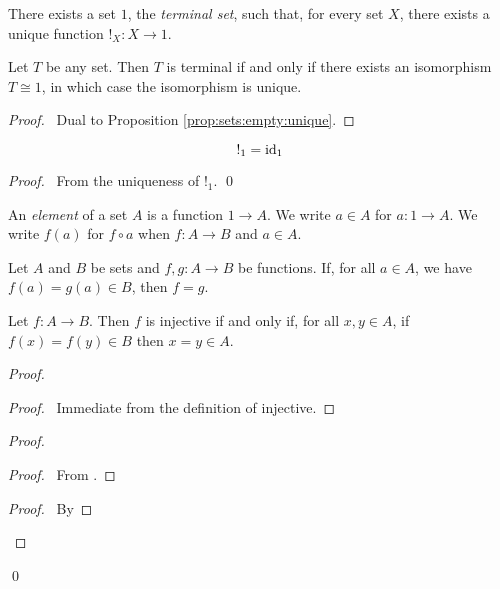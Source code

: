 \begin{ax}
  There exists a set $1$, the \emph{terminal set}, such that, for every set
  $X$, there exists a unique function $!_X : X \rightarrow 1$.
\end{ax}

\begin{prop}
  Let $T$ be any set. Then $T$ is terminal if and only if there exists an isomorphism $T \cong 1$, in which case the isomorphism is unique.
\end{prop}

\begin{proof}
  \pf\ Dual to Proposition \ref{prop:sets:empty:unique}.
\end{proof}

\begin{prop}
  \[ !_1 = \mathrm{id}_{1} \]
\end{prop}

\begin{proof}
  \pf\ From the uniqueness of $!_1$. \qed
\end{proof}

\begin{df}[Element]
  An \emph{element} of a set $A$ is a function $1 \rightarrow A$. We write $a
  \in A$ for $a : 1 \rightarrow A$. We write $f(a)$ for $f \circ a$ when $f :
  A \rightarrow B$ and $a \in A$.
\end{df}

\begin{ax}[Extensionality]
 Let $A$ and $B$ be sets and $f, g : A \rightarrow B$ be functions. If, for
all $a \in A$, we have $f(a) = g(a) \in B$, then $f = g$.
\end{ax}

\begin{prop}
  \label{prop:sets:injective:elements}
  Let $f : A \rightarrow B$. Then $f$ is injective if and only if, for all $x, y \in A$, if $f(x) = f(y) \in B$ then $x = y \in A$.
\end{prop}

\begin{proof}
  \pf
  \begin{proof}
    \pf\ Immediate from the definition of injective.
  \end{proof}
  \begin{proof}
    \begin{proof}
      \pf\ From .
    \end{proof}
    \begin{proof}
      \pf\ By 
    \end{proof}
  \end{proof}
  \qed
\end{proof}

